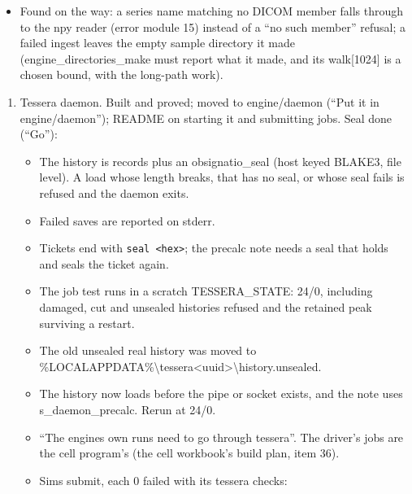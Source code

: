 \begin{itemize}
\item Found on the way: a series name matching no DICOM member falls through to the npy reader (error module 15) instead of a “no such member” refusal; a failed ingest leaves the empty sample directory it made (engine\_\allowbreak{}directories\_\allowbreak{}make must report what it made, and its walk[1024] is a chosen bound, with the long-path work).
\end{itemize}

\begin{enumerate}
\item Tessera daemon. Built and proved; moved to engine/daemon (“Put it in engine/daemon”); README on starting it and submitting jobs. Seal done (“Go”):

\begin{itemize}
\item The history is records plus an obsignatio\_\allowbreak{}seal (host keyed BLAKE3, file level). A load whose length breaks, that has no seal, or whose seal fails is refused and the daemon exits.
\item Failed saves are reported on stderr.
\item Tickets end with \texttt{seal <hex>}; the precalc note needs a seal that holds and seals the ticket again.
\item The job test runs in a scratch TESSERA\_\allowbreak{}STATE: 24/0, including damaged, cut and unsealed histories refused and the retained peak surviving a restart.
\item The old unsealed real history was moved to \%LOCALAPPDATA\%\textbackslash{}tessera<uuid>\textbackslash{}history.unsealed.
\item The history now loads before the pipe or socket exists, and the note uses s\_\allowbreak{}daemon\_\allowbreak{}precalc. Rerun at 24/0.
\item “The engines own runs need to go through tessera”. The driver's jobs are the cell program's (the cell workbook's build plan, item 36).
\item Sims submit, each 0 failed with its tessera checks:


\end{itemize}
\end{enumerate}
